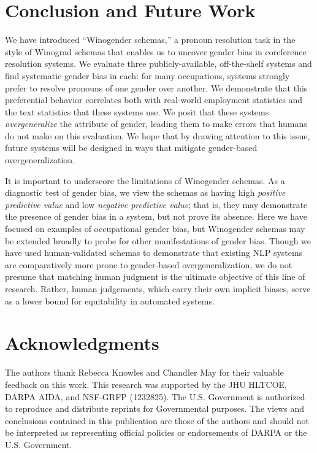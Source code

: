 \documentclass[11pt,a4paper]{article}
\begin{document}
\section{Conclusion and Future Work}
We have introduced ``Winogender schemas,'' a pronoun resolution task in the style of Winograd schemas that enables us to uncover gender bias in coreference resolution systems. We evaluate three publicly-available, off-the-shelf systems and find systematic gender bias in each: for many occupations, systems strongly prefer to resolve pronouns of one gender over another. We demonstrate that this preferential behavior correlates both with real-world employment statistics and the text statistics that these systems use. We posit that these systems \textit{overgeneralize} the attribute of gender, leading them to make errors that humans do not make on this evaluation.
We hope that by drawing attention to this issue, future systems will be designed in ways that mitigate gender-based overgeneralization.

It is important to underscore the limitations of Winogender schemas. As a diagnostic test of gender bias, we view the schemas as having high \textit{positive predictive value} and low \textit{negative predictive value}; that is, they may demonstrate the presence of gender bias in a system, but not prove its absence.
Here we have focused on examples of occupational gender bias, but Winogender schemas may be extended broadly to probe for other manifestations of gender bias.
Though we have used human-validated schemas to demonstrate that existing NLP systems are comparatively more prone to gender-based overgeneralization, we do not presume that matching human judgment is the ultimate objective of this line of research. Rather, human judgements, which carry their own implicit biases, serve as a lower bound for equitability in automated systems.


\section*{Acknowledgments}
The authors thank Rebecca Knowles and Chandler May for their valuable feedback on this work. This research was supported by the JHU HLTCOE, DARPA AIDA, and NSF-GRFP (1232825).  The U.S. Government is authorized to reproduce and distribute reprints for Governmental purposes. The views and conclusions contained in this publication are those of the authors and should not be interpreted as representing official policies or endorsements of DARPA or the U.S. Government.





\clearpage
\end{document}
